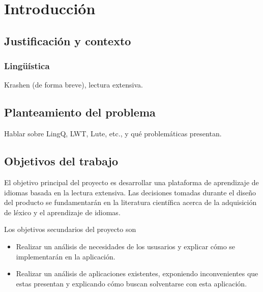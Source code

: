 \newpage{\pagestyle{empty}}
\chapter{Introducción}

\section{Justificación y contexto}

\subsection{Lingüística}

Krashen (de forma breve), lectura extensiva.

\section{Planteamiento del problema}

Hablar sobre LingQ, LWT, Lute, etc., y qué problemáticas presentan.

\section{Objetivos del trabajo}

El objetivo principal del proyecto es desarrollar una plataforma de aprendizaje de idiomas basada en la lectura extensiva. Las decisiones tomadas durante el diseño del producto se fundamentarán en la literatura científica acerca de la adquisición de léxico y el aprendizaje de idiomas.

Los objetivos secundarios del proyecto son
\begin{itemize}
	\item Realizar un análisis de necesidades de los ususarios y explicar cómo se implementarán en la aplicación.
	\item Realizar un análisis de aplicaciones existentes, exponiendo inconvenientes que estas presentan y explicando cómo buscan solventarse con esta aplicación.
\end{itemize}